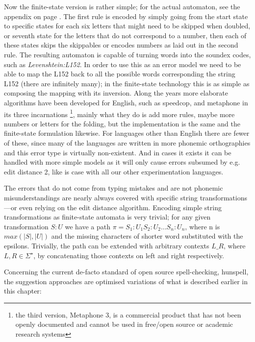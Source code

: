\documentclass[a4paper,12pt]{article}
\begin{document}
Now the finite-state version is rather simple; for the actual automaton, see
the appendix on page \pageref{appendix:soundex}. The first rule is encoded by
simply going from the start state to specific states for each six letters that
might need to be skipped when doubled, or seventh state for the letters that do
not correspond to a number, then each of these states skips the skippables or
encodes numbers as laid out in the second rule. The resulting automaton is
capable of turning words into the soundex codes, such as
\emph{Levenshtein:L152}. In order to use this as an error model we need to be
able to map the L152 back to all the possible words corresponding the string
L152 (there are infinitely many); in the finite-state technology this is as
simple as composing the mapping with its inversion. Along the years more
elaborate algorithms have been developed for English, such as speedcop, and
metaphone in its three incarnations
\cite[]{philips1990hanging,philips2000double}\footnote{the third version,
Metaphone 3, is a commercial product that has not been openly documented and
cannot be used in free/open source or academic research systems}, mainly what
they do is add more rules, maybe more numbers or letters for the folding, but
the implementation is the same and the finite-state formulation likewise. For
languages other than English there are fewer of these, since many of the
languages are written in more phonemic orthographies and this error type is
virtually non-existent. And in cases it exists it can be handled with more
simple models as it will only cause errors subsumed by e.g. edit distance 2,
like is case with all our other experimentation languages.

The errors that do not come from typing mistakes and are not phonemic
misunderstandings are nearly always covered with specific string
transformations---or even relying on the edit distance algorithm. Encoding
simple string transformations as finite-state automata is very trivial; for any
given transformation $S:U$ we have a path $\pi = S_1:U_1 S_2:U_2 \ldots
S_n:U_n$, where n is $max(|S|, |U|)$ and the missing characters of shorter word
substituted with the epsilons. Trivially, the path can be extended with arbitrary
contexts $L \_ R$, where $L, R \in \Sigma^{\star}$, by concatenating those
contexts on left and right respectively. 

Concerning the current de-facto standard of open source spell-checking,
hunspell, the suggestion approaches are optimised variations of what is
described earlier in this chapter:
\end{document}
